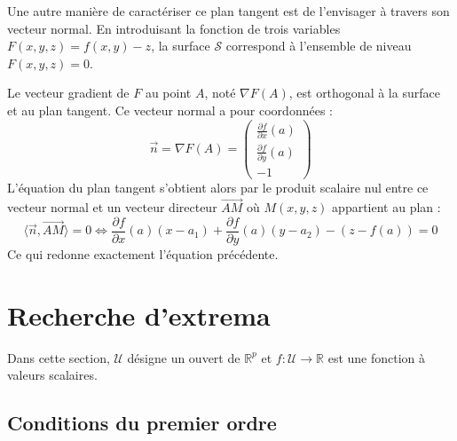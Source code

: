 \documentclass{article}
\begin{document}
 Une autre manière de caractériser ce plan tangent est de l'envisager à travers son vecteur normal. En introduisant la fonction de trois variables $F(x,y,z) = f(x,y) - z$, la surface $\mathcal{S}$ correspond à l'ensemble de niveau $F(x,y,z) = 0$. 

Le vecteur gradient de $F$ au point $A$, noté $\nabla F(A)$, est orthogonal à la surface et au plan tangent. Ce vecteur normal a pour coordonnées :
\[
\vec{n} = \nabla F(A) = \begin{pmatrix} \frac{\partial f}{\partial x}(a) \\ \frac{\partial f}{\partial y}(a) \\ -1 \end{pmatrix}
\]
L'équation du plan tangent s'obtient alors par le produit scalaire nul entre ce vecteur normal et un vecteur directeur $\vec{AM}$ où $M(x,y,z)$ appartient au plan :
\[
\langle \vec{n}, \vec{AM} \rangle = 0 \iff \frac{\partial f}{\partial x}(a)(x - a_1) + \frac{\partial f}{\partial y}(a)(y - a_2) - (z - f(a)) = 0
\]
Ce qui redonne exactement l'équation précédente.


\section{Recherche d'extrema}

Dans cette section, $\mathcal{U}$ désigne un ouvert de $\mathbb{R}^p$ et $f : \mathcal{U} \to \mathbb{R}$ est une fonction à valeurs scalaires.

\subsection{Conditions du premier ordre}
\end{document}
